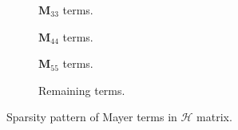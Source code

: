 \begin{figure}

\centering

\begin{subfigure}[b]{0.45\textwidth}

\vspace{-5mm}
\caption{$\bm{M}_{33}$ terms.}
\end{subfigure}
\begin{subfigure}[b]{0.45\textwidth}

\vspace{-5mm}
\caption{$\bm{M}_{44}$ terms.}
\end{subfigure}

\begin{subfigure}[b]{0.45\textwidth}

\vspace{-5mm}
\caption{$\bm{M}_{55}$ terms.}
\end{subfigure}
\begin{subfigure}[b]{0.45\textwidth}

\vspace{-5mm}
\caption{Remaining terms.}
\end{subfigure}


\caption{Sparsity pattern of Mayer terms in $\mathcal{H}$ matrix.\label{fig:figsparsityHmayer}}
\end{figure}